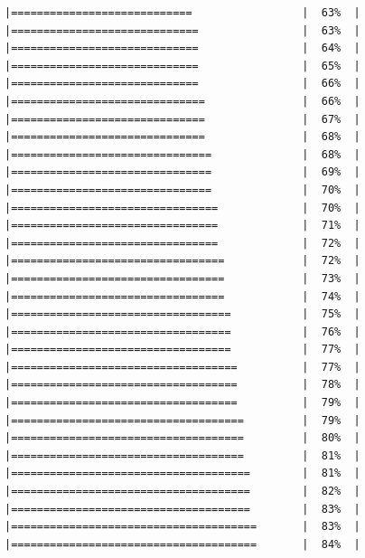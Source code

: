 \documentclass[
  krantz2]{krantz}
\begin{document}
\begin{verbatim}
|============================                 |  63%  |                                                     |=============================                |  63%  |                                                     |=============================                |  64%  |                                                     |=============================                |  65%  |                                                     |=============================                |  66%  |                                                     |==============================               |  66%  |                                                     |==============================               |  67%  |                                                     |==============================               |  68%  |                                                     |===============================              |  68%  |                                                     |===============================              |  69%  |                                                     |===============================              |  70%  |                                                     |================================             |  70%  |                                                     |================================             |  71%  |                                                     |================================             |  72%  |                                                     |=================================            |  72%  |                                                     |=================================            |  73%  |                                                     |=================================            |  74%  |                                                     |==================================           |  75%  |                                                     |==================================           |  76%  |                                                     |==================================           |  77%  |                                                     |===================================          |  77%  |                                                     |===================================          |  78%  |                                                     |===================================          |  79%  |                                                     |====================================         |  79%  |                                                     |====================================         |  80%  |                                                     |====================================         |  81%  |                                                     |=====================================        |  81%  |                                                     |=====================================        |  82%  |                                                     |=====================================        |  83%  |                                                     |======================================       |  83%  |                                                     |======================================       |  84%  |                        
\end{verbatim}
\end{document}
